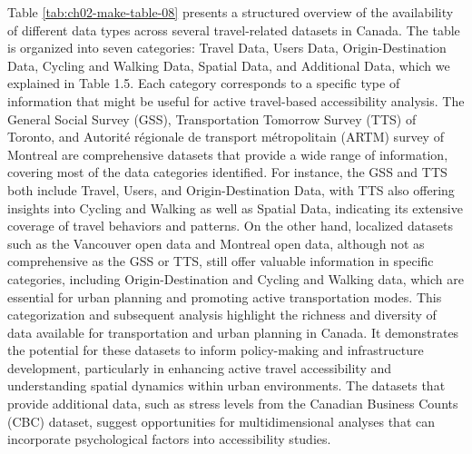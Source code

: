 \documentclass[
11pt, %
oneside, %
english, %
singlespacing, %
]{macthesis} %
\begin{document}
\newpage

Table \ref{tab:ch02-make-table-08} presents a structured overview of the availability of different data types across several travel-related datasets in Canada. The table is organized into seven categories: Travel Data, Users Data, Origin-Destination Data, Cycling and Walking Data, Spatial Data, and Additional Data, which we explained in Table 1.5. Each category corresponds to a specific type of information that might be useful for active travel-based accessibility analysis.
The General Social Survey (GSS), Transportation Tomorrow Survey (TTS) of Toronto, and Autorité régionale de transport métropolitain (ARTM) survey of Montreal are comprehensive datasets that provide a wide range of information, covering most of the data categories identified. For instance, the GSS and TTS both include Travel, Users, and Origin-Destination Data, with TTS also offering insights into Cycling and Walking as well as Spatial Data, indicating its extensive coverage of travel behaviors and patterns.
On the other hand, localized datasets such as the Vancouver open data and Montreal open data, although not as comprehensive as the GSS or TTS, still offer valuable information in specific categories, including Origin-Destination and Cycling and Walking data, which are essential for urban planning and promoting active transportation modes.
This categorization and subsequent analysis highlight the richness and diversity of data available for transportation and urban planning in Canada. It demonstrates the potential for these datasets to inform policy-making and infrastructure development, particularly in enhancing active travel accessibility and understanding spatial dynamics within urban environments. The datasets that provide additional data, such as stress levels from the Canadian Business Counts (CBC) dataset, suggest opportunities for multidimensional analyses that can incorporate psychological factors into accessibility studies.
\end{document}
